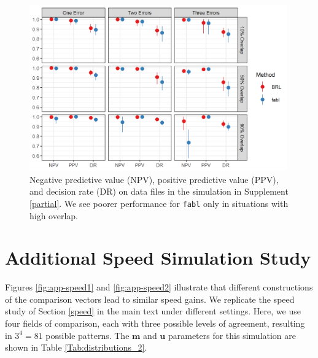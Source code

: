 \documentclass[ba,preprint]{imsart}
\begin{document}
\begin{figure}
	\begin{center}
		\includegraphics[width=0.99\textwidth]{../notes/figures/sadinle_sim_plot_partial2} 
		\caption{Negative predictive value (NPV), positive predictive value (PPV), and decision rate (DR) on data files in the simulation in Supplement \ref{partial}. We see poorer performance for \texttt{fabl} only in situations with high overlap.}
		\label{fig:sadinle_simulation_partial}
	\end{center}
\end{figure}

\clearpage

	\hypertarget{appendix-speed}{%
	\section{Additional Speed Simulation Study}\label{app:appendix-speed}}
	Figures \ref{fig:app-speed1} and \ref{fig:app-speed2} illustrate that different constructions of the comparison vectors lead to similar speed gains. We replicate the speed study of Section \ref{speed} in the main text under different settings. Here, we use four fields of comparison, each with three possible levels of agreement, resulting in $3^4 = 81$ possible patterns. The $\bm{m}$ and $\bm{u}$ parameters for this simulation are shown in Table \ref{Tab:distributions_2}.
	
\end{document}
